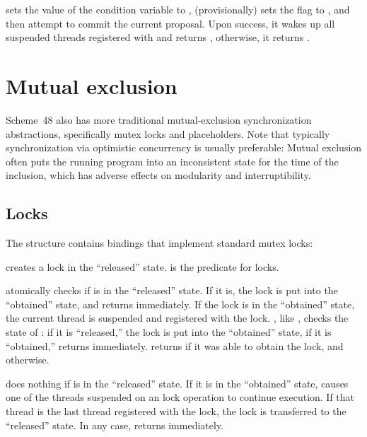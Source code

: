  sets the value of the
 condition variable to , (provisionally)
sets the  flag to , and then attempt to
commit the current proposal.  Upon success, it wakes up all suspended
threads registered with  and returns ,
otherwise, it returns .

\section{Mutual exclusion}

Scheme~48 also has more traditional mutual-exclusion synchronization
abstractions, specifically mutex locks and placeholders.  Note that
typically synchronization via optimistic concurrency is usually
preferable: Mutual exclusion often puts the running program into an
inconsistent state for the time of the inclusion, which has adverse
effects on modularity and interruptibility.

\subsection{Locks}

The  structure contains bindings that implement standard
mutex locks:
%
\begin{protos}
\end{protos}
%
 creates a lock in the ``released'' state.
 is the predicate for locks.

 atomically checks if  is in the
``released'' state.  If it is, the lock is put into the ``obtained''
state, and  returns immediately.  If the lock is in
the ``obtained'' state, the current thread is suspended and registered
with the lock.
, like , checks the state of
: if it is ``released,'' the lock is put into the
``obtained'' state, if it is ``obtained,'' 
returns immediately.   returns  if
it was able to obtain the lock, and  otherwise.

 does nothing if  is in the ``released''
state.  If it is in the ``obtained'' state, 
causes one of the threads suspended on an  lock
operation to continue execution.  If that thread is the last thread
registered with the lock, the lock is transferred to the ``released''
state.  In any case,  returns immediately.

